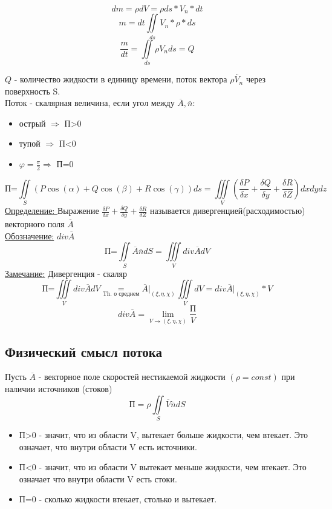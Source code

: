 \documentclass[12pt]{article}
\let\oldiint\iint
\let\oldiiint\iiint
\let\oldlim\lim
\renewcommand{\iint}{\oldiint\limits}
\renewcommand{\iiint}{\oldiiint\limits}
\renewcommand{\lim}{\oldlim\limits}
\begin{document}
  \begin{minipage}{0.55\textwidth}
    \[dm=\rho dV=\rho ds * V_n * dt\]
    \[m=dt \iint_{ds} V_n * \rho * ds\]
    \[\frac{m}{dt}=\iint_{ds} \rho V_n ds = Q\]
  \end{minipage}
  \vspace{1em}
  \par
  $Q$ - количество жидкости в единицу времени, поток вектора $\rho \overleftarrow{V_n}$ через поверхность S.\\
  Поток - скалярная величина, если угол между $\overline{A},\overline{n}$:
  \begin{itemize}
    \item острый $\Rightarrow$ П>0
    \item тупой $\Rightarrow$ П<0
    \item $\varphi = \frac{\pi}{2} \Rightarrow $ П=0
  \end{itemize}
  \[\text{П=} \iint_S (P\cos(\alpha)+Q\cos(\beta)+R\cos(\gamma))ds=\iiint_V
  (\frac{\delta P}{\delta x}+\frac{\delta Q}{\delta y}+\frac{\delta R}{\delta Z})dxdydz\]
  \underline{Определение: } Выражение 
  $\frac{\delta P}{\delta x}+\frac{\delta Q}{\delta y}+\frac{\delta R}{\delta Z}$ называется
  дивергенцией(расходимостью) векторного поля $\overline{A}$\\
  \underline{Обозначение:} $div \overline{A}$
  \[\text{П=} \iint_S \overline{A} \overline{n}dS=\iiint_V div \overline{A} dV\]
  \underline{Замечание:} Дивергенция - скаляр 
  \[\text{П=} \iiint_V div \overline{A} dV \underset{\hyperref[th:8.12.1]{\text{Th. о среднем}}}{=}
  \overline{A}\Big|_{(\xi,\eta,\chi)} \iiint_V dV= div\overline{A}\Big|_{(\xi,\eta,\chi)} *V \]
  \[div \overline{A} = \lim_{V \rightarrow (\xi,\eta,\chi)} \frac{\text{П}}{V}\]
  \subsection*{Физический смысл потока}
  Пусть $\overline{A}$ - векторное поле скоростей нестикаемой жидкости $(\rho = const)$ при наличии источников
  (стоков)
  \[\text{П} = \rho \iint_S \overline{V} \overline{n}dS\]
  \begin{itemize}
    \item П>0 - значит, что из области V, вытекает больше жидкости, чем втекает. Это означает, что внутри области
    V есть источники.
    \item П<0 - значит, что из области V вытекает меньше жидкости, чем втекает. Это означает что внутри области V есть стоки.
    \item П=0 - сколько жидкости втекает, столько и вытекает.
  \end{itemize}
\end{document}

